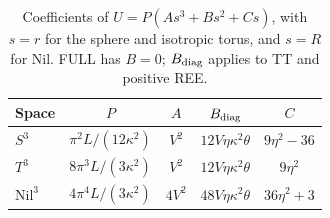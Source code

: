 \begin{table}[htbp]
\centering
\small
\caption{Coefficients of $U=P(As^3+Bs^2+Cs)$, with $s=r$ for the sphere and isotropic torus, and $s=R$ for Nil. FULL has $B=0$; $B_{\rm diag}$ applies to TT and positive REE.}\label{tab:v3:2}
\setlength{\tabcolsep}{4pt}
\renewcommand{\arraystretch}{1.25}
\begin{tabular}{lcccc}
\toprule
Space & $P$ & $A$ & $B_{\rm diag}$ & $C$ \\
\midrule
$S^3$ & $\pi^2L/(12\kappa^2)$ & $V^2$ & $12V\eta\kappa^2\theta$ & $9\eta^2-36$ \\
$T^3$ & $8\pi^3L/(3\kappa^2)$ & $V^2$ & $12V\eta\kappa^2\theta$ & $9\eta^2$ \\
$\mathrm{Nil}^3$ & $4\pi^4L/(3\kappa^2)$ & $4V^2$ & $48V\eta\kappa^2\theta$ & $36\eta^2+3$ \\
\bottomrule
\end{tabular}
\end{table}
